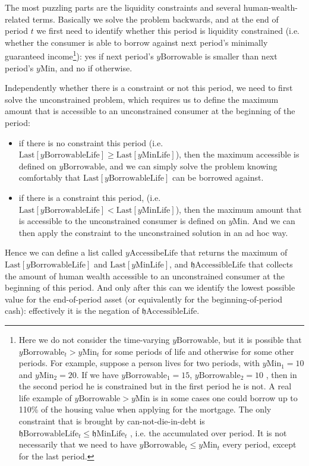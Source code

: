 \documentclass[titlepage,abstract]{\econtex}
\providecommand{\hEndMinLife}{\mathfrak{h}\text{MinLife}}
\providecommand{\hEndBorrowableLife}{\mathfrak{h}\text{BorrowableLife}}
\providecommand{\hEndAccessibleLife}{\mathfrak{h}\text{AccessibleLife}}
\providecommand{\yMinLife}{y\text{MinLife}}
\providecommand{\yBorrowableLife}{y\text{BorrowableLife}}
\providecommand{\yAccessibleLife}{y\text{AccessibeLife}}
\providecommand{\yMin}{y\text{Min}}
\providecommand{\yBorrowable}{y\text{Borrowable}}
\begin{document}
The most puzzling parts are the liquidity constraints and several human-wealth-related terms. Basically we solve the problem backwards, and at the end of period $t$ we first need to identify whether this period is liquidity constrained (i.e. whether the consumer is able to borrow against next period's minimally guaranteed income\footnote{Here we do not consider the time-varying $\yBorrowable$, but it is possible that $\yBorrowable_{t} > \yMin_{t}$ for some periods of life and otherwise for some other periods. For example, suppose a person lives for two periods, with $\yMin_{1}=10$ and $\yMin_{2}=20$. If we have $\yBorrowable_{1}=15$, $\yBorrowable_{2}=10$
, then in the second period he is constrained but in the first period he is not. A real life example of $\yBorrowable>\yMin$ is in some cases one could borrow up to 110\% of the housing value when applying for the mortgage.
The only constraint that is brought by can-not-die-in-debt is $\hEndBorrowableLife_{t} \leq \hEndMinLife_{t}$
, i.e. the accumulated over period. It is not necessarily that we need to have $\yBorrowable_{t} \leq \yMin_{t}$ every period, except for the last period.}): yes if next period's $\yBorrowable$ is smaller than next period's $\yMin$, and no if otherwise.

Independently whether there is a constraint or not this period, we need to first solve the unconstrained problem, which requires us to define the maximum amount that is accessible to an unconstrained consumer at the beginning of the period:
\begin{itemize}
\item if there is no constraint this period (i.e. $\text{Last}[\yBorrowableLife] \geq \text{Last}[\yMinLife]$), then the maximum accessible is defined on $\yBorrowable$, and we can simply solve the problem knowing comfortably that $\text{Last}[\yBorrowableLife]$ can be borrowed against.
\item if there is a constraint this period, (i.e. $\text{Last}[\yBorrowableLife]<\text{Last}[\yMinLife]$), then the maximum amount that is accessible to the unconstrained consumer is defined on $\yMin$. And we can then apply the constraint to the unconstrained solution in an ad hoc way.
\end{itemize}

Hence we can define a list called $\yAccessibleLife$ that returns the maximum of $\text{Last}[\yBorrowableLife]$ and $\text{Last}[\yMinLife]$, and $\hEndAccessibleLife$ that collects the amount of human wealth accessible to an unconstrained consumer at the beginning of this period. And only after this can we identify the lowest possible value for the end-of-period asset (or equivalently for the beginning-of-period cash): effectively it is the negation of $\hEndAccessibleLife$.
\end{document}
